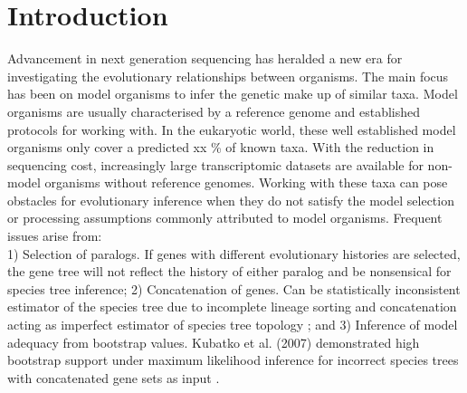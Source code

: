 \documentclass[12pt]{article}
\begin{document}
\section{Introduction}
Advancement in next generation sequencing has heralded a new era for investigating the evolutionary relationships between organisms. 
The main focus has been on model organisms to infer the genetic make up of similar taxa. 
Model organisms are usually characterised by a reference genome and established protocols for working with. 
In the eukaryotic world, these well established model organisms only cover a predicted xx \% of known taxa. 
With the reduction in sequencing cost, increasingly large transcriptomic datasets are available for non-model organisms without reference genomes. 
Working with these taxa can pose obstacles for evolutionary inference when they do not satisfy the model selection or processing assumptions commonly attributed to model organisms. Frequent issues arise from:\\
1) Selection of paralogs. If genes with different evolutionary histories are selected, the gene tree will not reflect the history of either paralog and be nonsensical for species tree inference; 
2) Concatenation of genes. Can be statistically inconsistent estimator of the species tree due to incomplete lineage sorting and concatenation acting as imperfect estimator of species tree topology \cite{roch2015likelihood}; and 
3) Inference of model adequacy from bootstrap values. Kubatko et al. (2007) demonstrated high bootstrap support under maximum likelihood inference for incorrect species trees with concatenated gene sets as input \cite{kubatko2007inconsistency}. 
\end{document}
